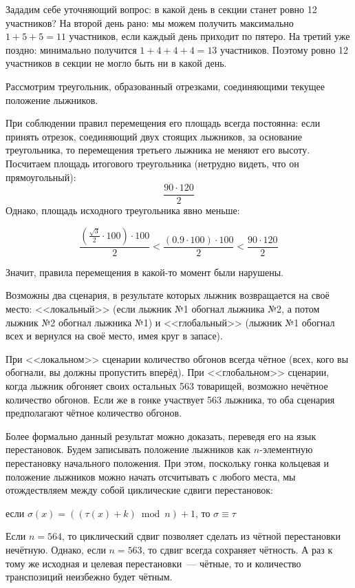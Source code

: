 \begin{itemize}
\itA Зададим себе уточняющий вопрос: в какой день в секции станет ровно 12 участников?
На второй день рано: мы можем получить максимально $1+5+5=11$ участников, если каждый день приходит по пятеро.
На третий уже поздно: минимально получится $1+4+4+4=13$ участников. 
Поэтому ровно 12 участников в секции не могло быть ни в какой день.

\itB Рассмотрим треугольник, образованный отрезками, соединяющими текущее положение лыжников.

\begin{center}  \end{center}

При соблюдении правил перемещения его площадь всегда постоянна: если принять
отрезок, соединяющий двух стоящих лыжников, за основание треугольника, 
то перемещения третьего лыжника не меняют его высоту.
Посчитаем площадь итогового треугольника (нетрудно видеть, что он прямоугольный): $$\frac{90\cdot 120}{2}$$
Однако, площадь исходного треугольника явно меньше:

$$\frac{\left(\frac{\sqrt{3}}{2}\cdot 100\right) \cdot 100}{2} < \frac{(0.9 \cdot 100) \cdot 100}{2} < \frac{90 \cdot 120}{2}$$

Значит, правила перемещения в какой-то момент были нарушены.

\itC Возможны два сценария, в результате которых лыжник возвращается на своё место: <<локальный>> 
(если лыжник №1 обогнал лыжника №2, а потом лыжник №2 обогнал лыжника №1) и <<глобальный>>
(лыжник №1 обогнал всех и вернулся на своё место, имея круг в запасе).

При <<локальном>> сценарии количество обгонов всегда чётное (всех, кого вы обогнали, вы должны пропустить вперёд).
При <<глобальном>> сценарии, когда лыжник обгоняет своих остальных 563 товарищей, возможно нечётное
количество обгонов.
Если же в гонке участвует 563 лыжника, то оба сценария предполагают чётное количество обгонов.

Более формально данный результат можно доказать, переведя его на язык перестановок. 
Будем записывать положение лыжников как $n$-элементную перестановку начального 
положения. 
При этом, поскольку гонка кольцевая и положение лыжников
можно начать отсчитывать с любого места, мы отождествляем между собой циклические
сдвиги перестановок: 
\begin{center}если $\sigma(x) = ((\tau(x)+k) \bmod n) + 1$, то $\sigma \equiv \tau$
\end{center}

Если $n = 564$, то циклический сдвиг позволяет сделать из чётной перестановки
нечётную. Однако, если $n=563$, то сдвиг всегда сохраняет чётность.
А раз к тому же исходная и целевая перестановки~--- чётные, 
то и количество транспозиций неизбежно будет чётным. 

\end{itemize}
